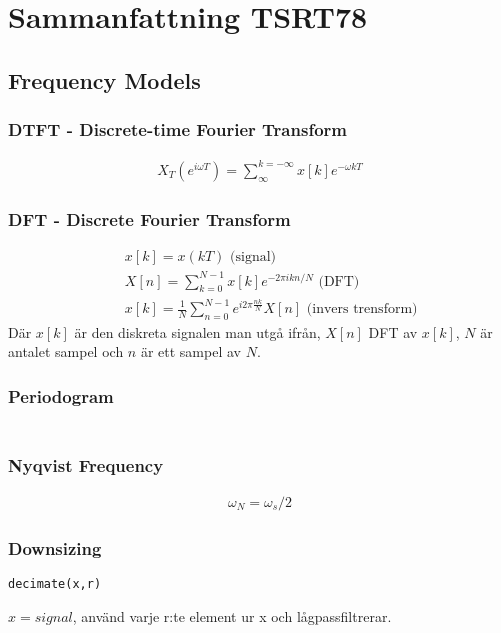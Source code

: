\documentclass[10pt,a4paper]{report}
\begin{document}
\chapter*{Sammanfattning TSRT78}

\section*{Frequency Models}
\subsection*{DTFT - Discrete-time Fourier Transform}
\begin{eqnarray}
X_T (e^{i \omega T}) = \sum_{\infty}^{k=-\infty} x[k] e^{-\omega k T}
\end{eqnarray}

\subsection*{DFT - Discrete Fourier Transform}
\begin{eqnarray}
&& x[k] = x(kT)  \textrm{   (signal) }\\
&& X[n] = \sum_{k=0}^{N-1} x[k] e^{-2 \pi i k n /N}  \textrm{   (DFT) }\\
&& x[k] = \frac{1}{N} \sum_{n=0}^{N-1} e^{i 2 \pi \frac{n k}{N}} X[n] \textrm{ (invers trensform)}
\end{eqnarray}
Där $x[k]$ är den diskreta signalen man utgå ifrån, $X[n]$ DFT av $x[k]$, $N$ är antalet sampel och $n$ är ett sampel av $N$.

\subsection*{Periodogram}
\begin{eqnarray}
\end{eqnarray}

\subsection*{Nyqvist Frequency}
\begin{eqnarray}
\omega _N = \omega _s /2
\end{eqnarray}

\subsection*{Downsizing}
\begin{verbatim}
decimate(x,r)
\end{verbatim}
$x = signal$, använd varje r:te element ur x och lågpassfiltrerar.
\end{document}
